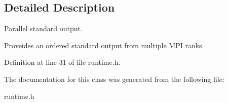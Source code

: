 \subsection{Detailed Description}
Parallel standard output. 

Proveides an ordered standard output from multiple M\+P\+I ranks. 

Definition at line 31 of file runtime.\+h.



The documentation for this class was generated from the following file\+:\begin{DoxyCompactItemize}
\item 
runtime.\+h\end{DoxyCompactItemize}
